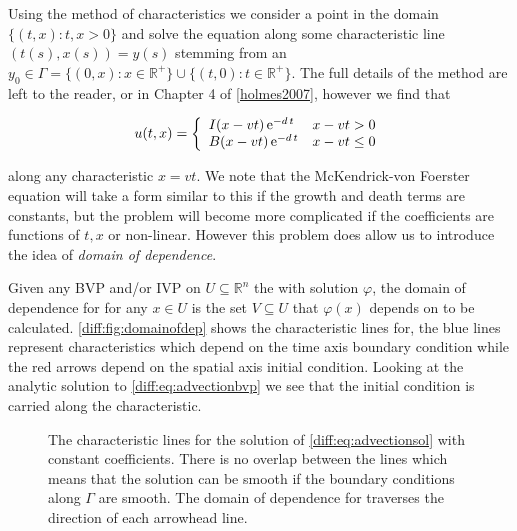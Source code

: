 \documentclass[../main.tex]{subfiles}
\begin{document}
  Using the method of characteristics we consider a point in the domain $\{(t, x) : t, x > 0 \}$ and solve the equation along some characteristic line $(t(s), x(s)) = y(s)$ stemming from an $y_0 \in \Gamma = \{ (0, x) : x \in \mathbb{R}^+ \} \cup \{ (t, 0) : t \in \mathbb{R}^+ \}$. The full details of the method are left to the reader, or in Chapter 4 of \autoref{holmes2007}, however we find that

  \begin{equation} \label{diff:eq:advectionsol}
    u(t, x) = \left\lbrace \begin{array}{ll}
      I(x - v t) \operatorname{e}^{-d \, t} & x - vt > 0 \\
      B(x - v t) \operatorname{e}^{-d \, t} & x - vt \leq 0 \\
  \end{array} \right.
  \end{equation}

  along any characteristic $x = vt$. We note that the McKendrick-von Foerster equation will take a form similar to this if the growth and death terms are constants, but the problem will become more complicated if the coefficients are functions of $t, x$ or non-linear. However this problem does allow us to introduce the idea of \emph{domain of dependence}.

  Given any BVP and/or IVP on $U \subseteq \mathbb{R}^n$ the with solution $\varphi$, the domain of dependence for for any $x \in U$ is the set $V \subseteq U$ that $\varphi(x)$ depends on to be calculated. \autoref{diff:fig:domainofdep} shows the characteristic lines for, the blue lines represent characteristics which depend on the time axis boundary condition while the red arrows depend on the spatial axis initial condition. Looking at the analytic solution to \autoref{diff:eq:advectionbvp} we see that the initial condition is carried along the characteristic.

  \begin{figure}[hbt]
    \centering

    \caption{The characteristic lines for the solution of \autoref{diff:eq:advectionsol} with constant coefficients. There is no overlap between the lines which means that the solution can be smooth if the boundary conditions along $\Gamma$ are smooth. The domain of dependence for traverses the direction of each arrowhead line. \label{diff:fig:domainofdep}}
  \end{figure}
\end{document}

